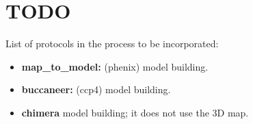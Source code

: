 \section{TODO}

List of protocols in the process to be incorporated:

\begin{itemize}
 \item \textbf{map\_to\_model:} (phenix)  model building.
 \item \textbf{buccaneer:} (ccp4)  model building.
 \item \textbf{chimera}  model building; it does not use the 3D map.
\end{itemize}
